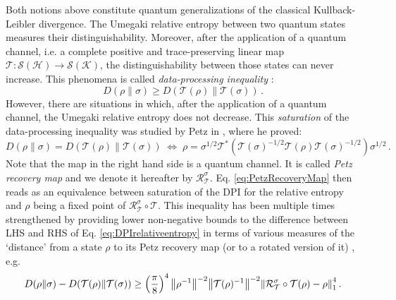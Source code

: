 \documentclass[11pt]{article}
\theoremstyle{newdefinition}
\theoremstyle{newplain}
\theoremstyle{myplain}
\DeclareMathOperator{\1}{\mathds{1}}
\begin{document}
Both notions above constitute quantum generalizations of the classical Kullback-Leibler divergence. The Umegaki relative entropy  between two quantum states measures their distinguishability. Moreover, after the application of a quantum channel, i.e. a complete positive and trace-preserving linear map $\mathcal{T}: \mathcal{S}(\mathcal{H}) \rightarrow  \mathcal{S}(\mathcal{K})$,  the distinguishability between those states can never increase. This phenomena is called \textit{data-processing inequality} \cite{Petz-MonotonicityRelativeEntropy-2003}:
\begin{equation}\label{eq:DPIrelativeentropy}
    D(\rho \| \sigma ) \geq D(\mathcal{T} (\rho) \| \mathcal{T}(\sigma) )  \, .
\end{equation}
However, there are situations in which, after the application of a quantum channel, the Umegaki relative entropy does not decrease. This \textit{saturation} of the data-processing inequality was studied by Petz in \cite{Petz-SufficiencyChannels-1978, Petz-SufficientSubalgebras-1986, Petz-MonotonicityRelativeEntropy-2003}, where he proved:
\begin{equation}\label{eq:PetzRecoveryMap}
    D(\rho \| \sigma ) = D(\mathcal{T} (\rho) \| \mathcal{T}(\sigma) )  \; \Leftrightarrow \; \rho = \sigma^{1/2} \mathcal{T}^* (\mathcal{T}(\sigma)^{-1/2} \mathcal{T}(\rho) \mathcal{T}(\sigma)^{-1/2}) \sigma^{1/2} \, .
\end{equation}
Note that the map in the right hand side is a quantum channel. It is called \textit{Petz recovery map} and we denote it hereafter by $\mathcal{R}^\sigma_{\mathcal{T}}$. Eq. \eqref{eq:PetzRecoveryMap} then reads as an equivalence between saturation of the DPI for the relative entropy and $\rho$ being a fixed point of $\mathcal{R}^\sigma_{\mathcal{T}}\circ \mathcal{T}$. This inequality has been multiple times strengthened by providing lower non-negative bounds to the difference between LHS and RHS of Eq. \eqref{eq:DPIrelativeentropy} in terms of various measures of the `distance' from a state $\rho$ to its Petz recovery map (or to a rotated version of it) \cite{Fawzi2015,Sutter2017b,Junge2018}, e.g.  \cite{CarlenVershynina-Stability-DPI-RE-2017}
\begin{equation}
     D(\rho \| \sigma ) - D(\mathcal{T} (\rho) \| \mathcal{T}(\sigma) ) \geq \left( \frac{\pi}{8} \right)^4 \norm{\rho^{-1}}^{-2} \norm{\mathcal{T}(\rho)^{-1}}^{-2} \norm{ \mathcal{R}^\sigma_{\mathcal{T}}\circ \mathcal{T}(\rho) - \rho }_1^4 \, .
\end{equation}
\end{document}
